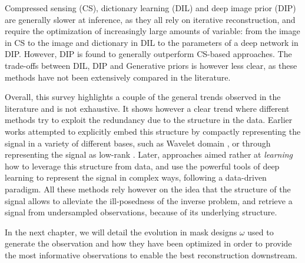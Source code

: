 Compressed sensing (CS), dictionary learning (DIL) and deep image prior (DIP) are generally slower at inference, as they all rely on iterative reconstruction, and require the optimization of increasingly large amounts of variable: from the image in CS to the image and dictionary in DIL to the parameters of a deep network in DIP. However, DIP is found to generally outperform CS-based approaches. The trade-offs between DIL, DIP and Generative priors is however less clear, as these methods have not been extensively compared in the literature. 

Overall, this survey highlights a couple of the general trends observed in the literature and is not exhaustive. It shows however a clear trend where different methods try to exploit the redundancy due to the structure in the data. Earlier works attempted to explicitly embed this structure by compactly representing the signal in a variety of different bases, such as Wavelet domain \citep{lustig2007sparse}, or through representing the signal as low-rank  \citep{lingala2011accelerated}. Later, approaches aimed rather at \textit{learning} how to leverage this structure from data, and use the powerful tools of deep learning to represent the signal in complex ways, following a data-driven paradigm. All these methods rely however on the idea that the structure of the signal allows to alleviate the ill-posedness of the inverse problem, and retrieve a signal from undersampled observations, because of its underlying structure. 

In the next chapter, we will detail the evolution in mask designs $\omega$ used to generate the observation and how they have been optimized in order to provide the most informative observations to enable the best reconstruction downstream.

